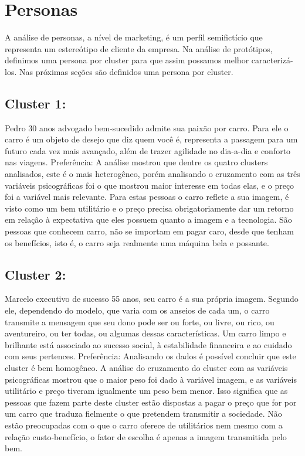 \section{Personas}

A análise de personas, a nível de marketing, é um perfil semifictício
que representa um estereótipo de cliente da empresa. Na análise de
protótipos, definimos uma persona por cluster para que assim possamos
melhor caracterizá-los. Nas próximas seções são definidos uma persona
por cluster.


\subsection{Cluster 1: \nomeCa{}}

Pedro 30 anos advogado bem-sucedido admite sua paixão por carro. Para
ele o carro é um objeto de desejo que diz quem você é, representa
a passagem para um futuro cada vez mais avançado, além de trazer agilidade
no dia-a-dia e conforto nas viagens. Preferência: A análise mostrou
que dentre os quatro clusters analisados, este é o mais heterogêneo,
porém analisando o cruzamento com as três variáveis psicográficas
foi o que mostrou maior interesse em todas elas, e o preço foi a variável
mais relevante. Para estas pessoas o carro reflete a sua imagem, é
visto como um bem utilitário e o preço precisa obrigatoriamente dar
um retorno em relação à expectativa que eles possuem quanto a imagem
e a tecnologia. São pessoas que conhecem carro, não se importam em
pagar caro, desde que tenham os benefícios, isto é, o carro seja realmente
uma máquina bela e possante. 


\subsection{Cluster 2: \nomeCb{}}

Marcelo executivo de sucesso 55 anos, seu carro é a sua própria imagem.
Segundo ele, dependendo do modelo, que varia com os anseios de cada
um, o carro transmite a mensagem que seu dono pode ser ou forte, ou
livre, ou rico, ou aventureiro, ou ter todas, ou algumas dessas características.
Um carro limpo e brilhante está associado ao sucesso social, à estabilidade
financeira e ao cuidado com seus pertences. Preferência: Analisando
os dados é possível concluir que este cluster é bem homogêneo. A análise
do cruzamento do cluster com as variáveis psicográficas mostrou que
o maior peso foi dado à variável imagem, e as variáveis utilitário
e preço tiveram igualmente um peso bem menor. Isso significa que as
pessoas que fazem parte deste cluster estão dispostas a pagar o preço
que for por um carro que traduza fielmente o que pretendem transmitir
a sociedade. Não estão preocupadas com o que o carro oferece de utilitários
nem mesmo com a relação custo-benefício, o fator de escolha é apenas
a imagem transmitida pelo bem. 



